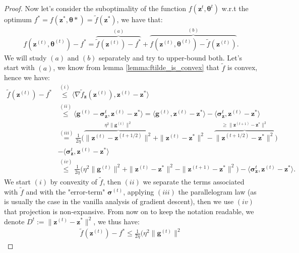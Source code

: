 \begin{proof}
Now let's consider the suboptimality of the function $f(\bm{z}^{t},\bm{\theta}^t)$ w.r.t the optimum $f^*=f(\bm{z}^*,\bm{\theta}*)=\tilde{f}(\bm{z}^{*})$, we have that:
\begin{align*}
    f(\bm{z}^{(t)},\bm{\theta}^{(t)}) - f^* = 
    \overbrace{\tilde{f}(\bm{z}^{(t)}) - f^* }^{(a)}
    + \overbrace{f(\bm{z}^{(t)},\bm{\theta}^{(t)}) - \tilde{f}(\bm{z}^{(t)})}^{(b)}.
\end{align*}
We will study $(a)$ and $(b)$ separately and try to upper-bound both. Let's start with $(a)$, we know from lemma \ref{lemma:ftilde_is_convex} that $\tilde{f}$ is convex, hence we have:
\begin{align*}
    \tilde{f}(\bm{z}^{(t)}) - f^* & \stackrel{(i)}{\leq} 
     \langle  \nabla \tilde{f}_{\bm{z}} (\bm{z}^{(t)}) 
    , \bm{z}^{(t)} - \bm{z}^* \rangle \\
    & \stackrel{(ii)}{\leq} 
    \langle  \bm{g}^{(t)} -\bm{\sigma}_{\bm{z}}^{t}
    , \bm{z}^{(t)} - \bm{z}^* \rangle 
    = 
    \langle  \bm{g}^{(t)} 
    , \bm{z}^{(t)} - \bm{z}^* \rangle 
    - \langle \bm{\sigma}_{\bm{z}}^{t}
    , \bm{z}^{(t)} - \bm{z}^* \rangle \\
    & \stackrel{(iii)}{=} 
    \frac{1}{2\eta} \Big( 
        \overbrace{ \|\bm{z}^{(t)} - \bm{z}^{(t+1/2)} \|^2}^{
         \eta^2\|\bm{g}^{(t)}\|^2
        }
         + \|\bm{z}^{(t)} - \bm{z}^* \|^2
         - \overbrace{\|\bm{z}^{(t+1/2)} - \bm{z}^* \|^2}^{
             \geq \|\bm{z}^{(t+1)} - \bm{z}^* \|^2 
         } 
     \Big) \\
    &- \langle \bm{\sigma}_{\bm{z}}^{t}
    , \bm{z}^{(t)} - \bm{z}^* \rangle \\
    & \stackrel{(iv)}{\leq} 
    \frac{1}{2\eta} \Big( 
         \eta^2\|\bm{g}^{(t)}\|^2
         + \|\bm{z}^{(t)} - \bm{z}^* \|^2
             - \|\bm{z}^{(t+1)} - \bm{z}^* \|^2 
     \Big) 
    - \langle \bm{\sigma}_{\bm{z}}^{t}
    , \bm{z}^{(t)} - \bm{z}^* \rangle. 
\end{align*}
We start $(i)$ by convexity of $\tilde{f}$, then $(ii)$ we separate the terms associated with $\tilde{f}$ and with the "error-term" $\bm{\sigma}^{(t)}$, applying $(iii)$ the parallelogram law (as is usually the case in the vanilla analysis of gradient descent), then we use $(iv)$ that projection is non-expansive. From now on to keep the notation readable, we denote $D^{t} :=\|\bm{z}^{(t)} - \bm{z}^* \|^2$, we thus have:
\begin{align*}
    \tilde{f}(\bm{z}^{(t)}) - f^* \leq 
    \frac{1}{2\eta} \Big( 
         \eta^2\|\bm{g}^{(t)}\|^2

\end{align*}
\end{proof}
